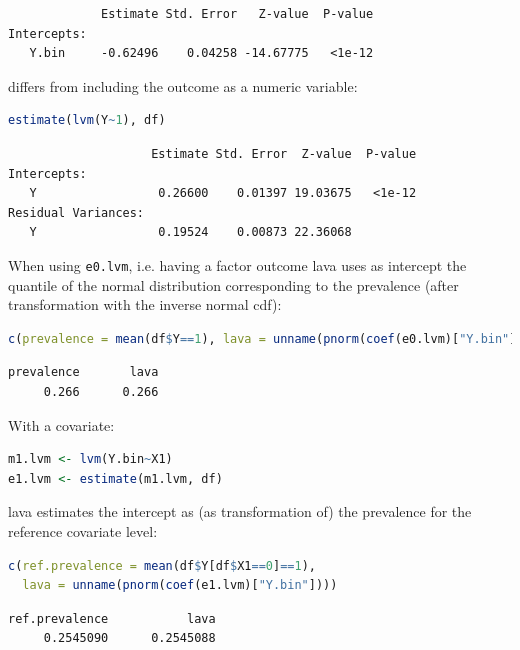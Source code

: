 \documentclass{article}
\begin{document}
\label{}
\begin{verbatim}
             Estimate Std. Error   Z-value  P-value
Intercepts:                                        
   Y.bin     -0.62496    0.04258 -14.67775   <1e-12
\end{verbatim}


differs from including the outcome as a numeric variable:
\begin{lstlisting}[language=r,numbers=none]
estimate(lvm(Y~1), df)
\end{lstlisting}

\label{}
\begin{verbatim}
                    Estimate Std. Error  Z-value  P-value
Intercepts:                                              
   Y                 0.26600    0.01397 19.03675   <1e-12
Residual Variances:                                      
   Y                 0.19524    0.00873 22.36068
\end{verbatim}


When using \texttt{e0.lvm}, i.e. having a factor outcome lava uses as
intercept the quantile of the normal distribution corresponding to the
prevalence (after transformation with the inverse normal cdf):
\begin{lstlisting}[language=r,numbers=none]
c(prevalence = mean(df$Y==1), lava = unname(pnorm(coef(e0.lvm)["Y.bin"])))
\end{lstlisting}

\label{}
\begin{verbatim}
prevalence       lava 
     0.266      0.266
\end{verbatim}


With a covariate:
\begin{lstlisting}[language=r,numbers=none]
m1.lvm <- lvm(Y.bin~X1)
e1.lvm <- estimate(m1.lvm, df)
\end{lstlisting}

lava estimates the intercept as (as transformation of) the prevalence for the reference covariate level:
\begin{lstlisting}[language=r,numbers=none]
c(ref.prevalence = mean(df$Y[df$X1==0]==1),
  lava = unname(pnorm(coef(e1.lvm)["Y.bin"])))
\end{lstlisting}

\label{}
\begin{verbatim}
ref.prevalence           lava 
     0.2545090      0.2545088
\end{verbatim}
\end{document}
